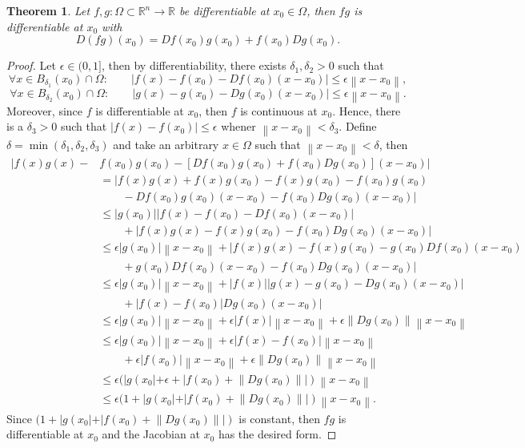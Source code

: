 \documentclass{article}
\theoremstyle{plain}
\newtheorem{theorem}{Theorem}[subsection]
\theoremstyle{definition}
\newcommand{\R}{\mathbb{R}}
\newcommand{\norm}[1]{\left\lVert#1 \right\rVert}
\begin{document}
\begin{theorem}
    Let $f,g : \Omega \subset \R^n \to \R$ be differentiable at $x_0 \in \Omega$, then $fg$ is differentiable at $x_0$ with
    $$D(fg)(x_0) = Df(x_0)g(x_0) + f(x_0)Dg(x_0).$$
\end{theorem}

\begin{proof}
    Let $\epsilon \in (0, 1]$, then by differentiability, there exists $\delta_1, \delta_2 > 0$ such that 
    $$\forall x \in B_{\delta_1}(x_0) \cap \Omega : \qquad |f(x) - f(x_0) - Df(x_0)(x - x_0)| \leq \epsilon\norm{x - x_0},$$
    $$\forall x \in B_{\delta_2}(x_0) \cap \Omega : \qquad |g(x) - g(x_0) - Dg(x_0)(x - x_0)| \leq \epsilon\norm{x - x_0}.$$
    Moreover, since $f$ is differentiable at $x_0$, then $f$ is continuous at $x_0$. Hence, there is a $\delta_3 > 0$ such that $|f(x) - f(x_0)| \leq \epsilon$ whener $\norm{x - x_0} < \delta_3$. Define $\delta = \min(\delta_1, \delta_2, \delta_3)$ and take an arbitrary $x \in \Omega$ such that $\norm{x - x_0} < \delta$, then 
    \begin{align*}
        |f(x)g(x) - &f(x_0)g(x_0) - [Df(x_0)g(x_0) + f(x_0)Dg(x_0)](x - x_0)| \\
        &= |f(x)g(x) + f(x)g(x_0) - f(x)g(x_0) - f(x_0)g(x_0) \\
        & \qquad - Df(x_0)g(x_0)(x - x_0) - f(x_0)Dg(x_0)(x - x_0)| \\
        &\leq |g(x_0)||f(x) - f(x_0) - Df(x_0)(x - x_0)| \\
        &\qquad + |f(x)g(x) - f(x)g(x_0) - f(x_0)Dg(x_0)(x - x_0)| \\
        &\leq \epsilon|g(x_0)|\norm{x - x_0} + |f(x)g(x) - f(x)g(x_0) - g(x_0)Df(x_0)(x - x_0) \\
        & \qquad + g(x_0)Df(x_0)(x - x_0)- f(x_0)Dg(x_0)(x - x_0)| \\
        &\leq \epsilon|g(x_0)|\norm{x - x_0} + |f(x)||g(x) - g(x_0) - Dg(x_0)(x - x_0)| \\
        & \qquad + |f(x) - f(x_0)|Dg(x_0)(x - x_0)| \\
        &\leq \epsilon|g(x_0)|\norm{x - x_0} + \epsilon|f(x)|\norm{x - x_0} + \epsilon \norm{Dg(x_0)} \norm{x - x_0} \\
        &\leq \epsilon|g(x_0)|\norm{x - x_0} + \epsilon|f(x) - f(x_0)|\norm{x - x_0} \\
        &\qquad + \epsilon|f(x_0)|\norm{x - x_0} + \epsilon \norm{Dg(x_0)} \norm{x - x_0} \\
        &\leq \epsilon (|g(x_0| + \epsilon + |f(x_0) + \norm{Dg(x_0)}|)\norm{x - x_0} \\
        &\leq \epsilon (1 + |g(x_0| + |f(x_0) + \norm{Dg(x_0)}|)\norm{x - x_0}.
    \end{align*}
    Since $(1 + |g(x_0| + |f(x_0) + \norm{Dg(x_0)}|)$ is constant, then $fg$ is differentiable at $x_0$ and the Jacobian at $x_0$ has the desired form. 
\end{proof}
\end{document}
